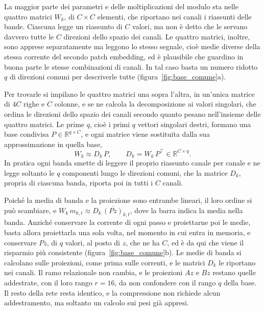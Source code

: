 La maggior parte dei parametri e delle moltiplicazioni del modulo sta nelle quattro matrici $W_k$, di $C\times C$ elementi, che riportano nei canali i riassunti delle bande. Ciascuna legge un riassunto di $C$ valori, ma non è detto che le servano davvero tutte le $C$ direzioni dello spazio dei canali. Le quattro matrici, inoltre, sono apprese separatamente ma leggono lo stesso segnale, cioè medie diverse della stessa corrente del secondo patch embedding, ed è plausibile che guardino in buona parte le stesse combinazioni di canali. In tal caso basta un numero ridotto $q$ di direzioni comuni per descriverle tutte (figura~\ref{fig:base_comune}a).

Per trovarle si impilano le quattro matrici una sopra l'altra, in un'unica matrice di $4C$ righe e $C$ colonne, e se ne calcola la decomposizione ai valori singolari, che ordina le direzioni dello spazio dei canali secondo quanto pesano nell'insieme delle quattro matrici. Le prime $q$, cioè i primi $q$ vettori singolari destri, formano una base condivisa $P\in\mathbb R^{q\times C}$, e ogni matrice viene sostituita dalla sua approssimazione in quella base,
\begin{equation}
\label{eq:base_condivisa}
W_k\approx D_k\,P,
\qquad
D_k=W_k\,P^{\top}\in\mathbb R^{C\times q}.
\end{equation}
In pratica ogni banda smette di leggere il proprio riassunto canale per canale e ne legge soltanto le $q$ componenti lungo le direzioni comuni, che la matrice $D_k$, propria di ciascuna banda, riporta poi in tutti i $C$ canali.

Poiché la media di banda e la proiezione sono entrambe lineari, il loro ordine si può scambiare, e $W_k\,m_{k,t}\approx D_k\,\overline{(Pz)}_{k,t}$, dove la barra indica la media nella banda. Anziché conservare la corrente di ogni passo e proiettarne poi le medie, basta allora proiettarla una sola volta, nel momento in cui entra in memoria, e conservare $Pz$, di $q$ valori, al posto di $z$, che ne ha $C$, ed è da qui che viene il risparmio più consistente (figura~\ref{fig:base_comune}b). Le medie di banda si calcolano sulle proiezioni, come prima sulle correnti, e le matrici $D_k$ le riportano nei canali. Il ramo relazionale non cambia, e le proiezioni $Az$ e $Bz$ restano quelle addestrate, con il loro rango $r=16$, da non confondere con il rango $q$ della base. Il resto della rete resta identico, e la compressione non richiede alcun addestramento, ma soltanto un calcolo sui pesi già appresi.

